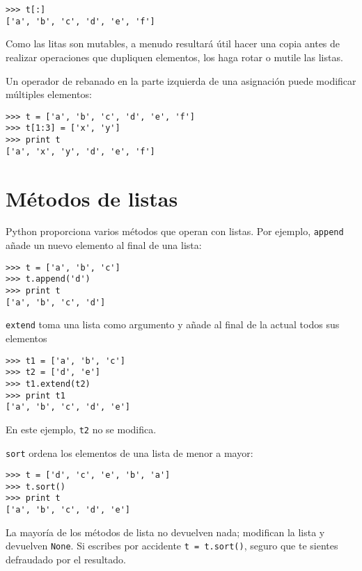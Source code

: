 \beforeverb
\begin{verbatim}
>>> t[:]
['a', 'b', 'c', 'd', 'e', 'f']
\end{verbatim}
\afterverb
%
Como las litas son mutables, a menudo resultará útil hacer una copia
antes de realizar operaciones que dupliquen elementos, los haga rotar o mutile
las listas.


Un operador de rebanado en la parte izquierda de una asignación
puede modificar múltiples elementos:


\beforeverb
\begin{verbatim}
>>> t = ['a', 'b', 'c', 'd', 'e', 'f']
>>> t[1:3] = ['x', 'y']
>>> print t
['a', 'x', 'y', 'd', 'e', 'f']
\end{verbatim}
\afterverb
%

\section{Métodos de listas}


Python proporciona varios métodos que operan con listas. Por ejemplo,
{\tt append} añade un nuevo elemento al final de una lista:


\beforeverb
\begin{verbatim}
>>> t = ['a', 'b', 'c']
>>> t.append('d')
>>> print t
['a', 'b', 'c', 'd']
\end{verbatim}
\afterverb
%
{\tt extend} toma una lista como argumento y añade al final de la actual
todos sus elementos


\beforeverb
\begin{verbatim}
>>> t1 = ['a', 'b', 'c']
>>> t2 = ['d', 'e']
>>> t1.extend(t2)
>>> print t1
['a', 'b', 'c', 'd', 'e']
\end{verbatim}
\afterverb
%
En este ejemplo, {\tt t2} no se modifica.

{\tt sort} ordena los elementos de una lista de menor a mayor:


\beforeverb
\begin{verbatim}
>>> t = ['d', 'c', 'e', 'b', 'a']
>>> t.sort()
>>> print t
['a', 'b', 'c', 'd', 'e']
\end{verbatim}
\afterverb
%
La mayoría de los métodos de lista no devuelven nada; modifican la lista y devuelven {\tt None}.
Si escribes por accidente {\tt t = t.sort()}, seguro que te sientes defraudado
por el resultado.

